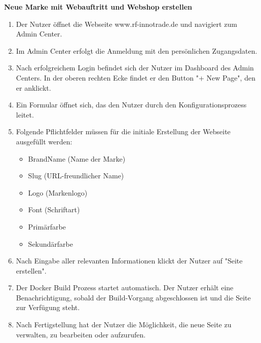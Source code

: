 \textbf{Neue Marke mit Webauftritt und Webshop erstellen}

\begin{enumerate}
    \item Der Nutzer öffnet die Webseite www.rf-innotrade.de und navigiert zum Admin Center.
    \item Im Admin Center erfolgt die Anmeldung mit den persönlichen Zugangsdaten.
    \item Nach erfolgreichem Login befindet sich der Nutzer im Dashboard des Admin Centers. In der oberen rechten Ecke findet er den Button "+ New Page", den er anklickt.
    \item Ein Formular öffnet sich, das den Nutzer durch den Konfigurationsprozess leitet.
    \item Folgende Pflichtfelder müssen für die initiale Erstellung der Webseite ausgefüllt werden:
    \begin{itemize}
        \item BrandName (Name der Marke)
        \item Slug (URL-freundlicher Name)
        \item Logo (Markenlogo)
        \item Font (Schriftart)
        \item Primärfarbe
        \item Sekundärfarbe
    \end{itemize}
    \item Nach Eingabe aller relevanten Informationen klickt der Nutzer auf "Seite erstellen".
    \item Der Docker Build Prozess startet automatisch. Der Nutzer erhält eine Benachrichtigung, sobald der Build-Vorgang abgeschlossen ist und die Seite zur Verfügung steht.
    \item Nach Fertigstellung hat der Nutzer die Möglichkeit, die neue Seite zu verwalten, zu bearbeiten oder aufzurufen.
\end{enumerate}